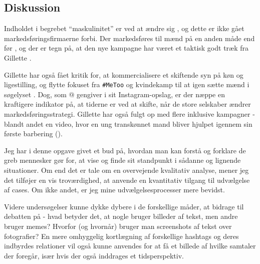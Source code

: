 \subsection{Diskussion}

Indholdet i begrebet “maskulinitet” er ved at ændre sig 
\autocite{gilpinBoysMenTeaching2018}, og dette er ikke gået 
markedsføringsfirmaerne forbi.  Der markedsføres til mænd på en 
anden måde end før \autocite{smithMeTooChangedWay2018}, og der er 
tegn på, at den nye kampagne har været et taktisk godt træk fra 
Gillette \autocite{commetricGilletteAdControversy2019}.

Gillette har også fået kritik for, at kommercialisere et skiftende 
syn på køn og ligestilling, og flytte fokuset fra \texttt{\#MeToo} 
og kvindekamp til at igen sætte mænd i søgelyset 
\autocite{bergmanCelebratedNewGillette2019}. Dog, som 
@\citeauthor{elle_sciencekitty2019} gengiver i sit 
Instagram-opslag, er der næppe en kraftigere indikator på, at 
tiderne er ved at skifte, når de store selskaber ændrer 
markedsføringsstrategi. Gillette har også fulgt op med flere 
inklusive kampagner - blandt andet en video, hvor en ung 
transkønnet mand bliver hjulpet igennem sin første barbering 
(\citeyear{gilletteFirstShaveStory2019}).

Jeg har i denne opgave givet et bud på, hvordan man kan forstå og 
forklare de greb mennesker gør for, at vise og finde sit 
standpunkt i sådanne og lignende situationer. Om end det er tale 
om en overvejende kvalitativ analyse, mener jeg det tilføjer en 
vis troværdighed, at anvende en kvantitativ tilgang til udvælgelse 
af cases. Om ikke andet, er jeg mine udvælgelsesprocesser mere 
bevidst.

Videre undersøgelser kunne dykke dybere i de forskellige måder, at 
bidrage til debatten på - hvad betyder det, at nogle bruger 
billeder af tekst, men andre bruger memes? Hvorfor (og hvornår) 
bruger man screenshots af tekst over fotografier? En mere 
omhyggelig kortlægning af forskellige hashtags og deres indbyrdes 
relationer vil også kunne anvendes for at få et billede af hvilke 
samtaler der foregår, især hvis der også inddrages et 
tidsperspektiv.

